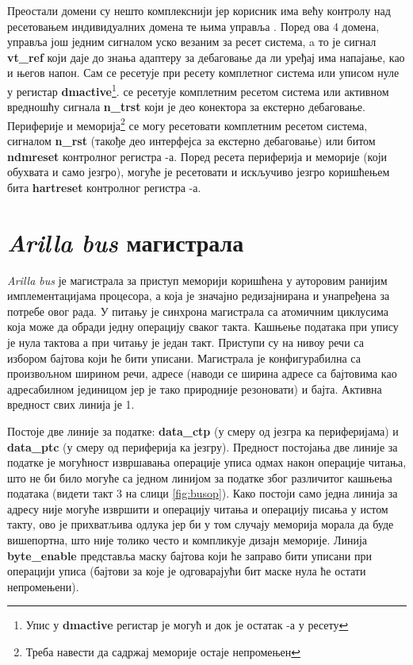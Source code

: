 Преостали домени су нешто комплекснији јер корисник има већу контролу над ресетовањем индивидуалних домена те њима управља . Поред ова 4 домена,  управља још једним сигналом уско везаним за ресет система, a то је сигнал \textbf{vt\_ref} који даје до знања адаптеру за дебаговање да ли уређај има напајање, као и његов напон.
Сам  се ресетује при ресету комплетног система или уписом нуле у регистар \textbf{dmactive}\footnote{Упис у \textbf{dmactive} регистар је могућ и док је остатак -а у ресету}.
 се ресетује комплетним ресетом система или активном вредношћу сигнала \textbf{n\_trst} који је део конектора за екстерно дебаговање.
Периферије и меморија\footnote{Треба навести да садржај меморије остаје непромењен} се могу ресетовати комплетним ресетом система, сигналом \textbf{n\_rst} (такође део интерфејса за екстерно дебаговање) или битом \textbf{ndmreset} контролног регистра -а.
Поред ресета периферија и меморије (који обухвата и само језгро), могуће је ресетовати и искључиво језгро коришћењем бита \textbf{hartreset} контролног регистра -а.

\section{\textit{Arilla bus} магистрала}

\textit{Arilla bus} је магистрала за приступ меморији коришћена у ауторовим ранијим имплементацијама  процесора\cite{arilla}, а која је значајно редизајнирана и унапређена за потребе овог рада. У питању је синхрона магистрала са атомичним циклусима која може да обради једну операцију сваког такта. Кашњење података при упису је нула тактова а при читању је један такт. Приступи су на нивоу речи са избором бајтова који ће бити уписани.
Магистрала је конфигурабилна са произвољном ширином речи, адресе (наводи се ширина адресе са бајтовима као адресабилном јединицом јер је тако природније резоновати) и бајта. Активна вредност свих линија је 1.



Постоје две линије за податке: \textbf{data\_ctp} (у смеру од језгра ка периферијама) и \textbf{data\_ptc} (у смеру од периферија ка језгру). Предност постојања две линије за податке је могућност извршавања операције уписа одмах након операције читања, што не би било могуће са једном линијом за податке због различитог кашњења података (видети такт 3 на слици \ref{fig:busop}). Како постоји само једна линија за адресу није могуће извршити и операцију читања и операцију писања у истом такту, ово је прихватљива одлука јер би у том случају меморија морала да буде вишепортна, што није толико често и компликује дизајн меморије. Линија \textbf{byte\_enable} представља маску бајтова који ће заправо бити уписани при операцији уписа (бајтови за које је одговарајући бит маске нула ће остати непромењени).

